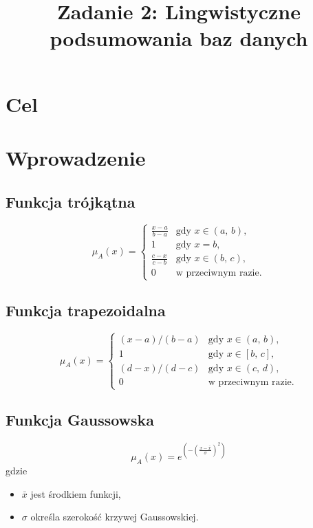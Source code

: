 \documentclass{classrep}
\author{
	\studentinfo{Radosław Grela}{216769} \and
	\studentinfo{Jakub Wąchała}{216914} 
}
\title{Zadanie 2: Lingwistyczne podsumowania baz danych}
\begin{document}
	\maketitle
	
	\section{Cel} %
	
	
	\section{Wprowadzenie} %
	
	\subsection{Funkcja trójkątna}
	

\[\mu_A(x) = \begin{cases}
\frac{x-a}{b-a} & \mbox{gdy } x \in (a,\, b), \\
1                 & \mbox{gdy } x = b, \\
\frac{c-x}{c-b} & \mbox{gdy } x \in (b,\, c), \\
0                 & \mbox{w przeciwnym razie}.
\end{cases}\]
	\subsection{Funkcja trapezoidalna}

\[\mu_A(x) = \begin{cases}
(x - a) / (b - a) & \mbox{gdy } x \in (a,\, b), \\
1                 & \mbox{gdy } x \in [b,\, c], \\
(d - x) / (d - c) & \mbox{gdy } x \in (c,\, d), \\
0                 & \mbox{w przeciwnym razie}.
\end{cases}\]
	
	
	\subsection{Funkcja Gaussowska \cite{kul}} 
\begin{equation}
	\mu_A(x) = e^{(-(\frac{x - \bar{x}}{\sigma})^2)}
\end{equation}
gdzie 
\begin{itemize}
	\item $\bar{x}$ jest środkiem funkcji,
	\item $\sigma$ określa szerokość krzywej Gaussowskiej. 
\end{itemize}
	
\end{document}

